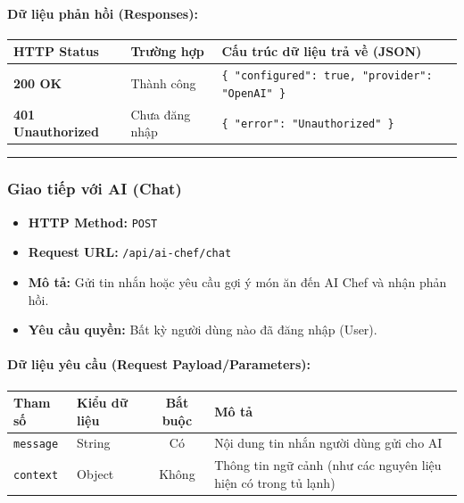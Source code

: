 \documentclass[12pt,a4paper]{article}
\begin{document}
\paragraph{Dữ liệu phản hồi (Responses):}
\begin{longtable}{|>{\raggedright\arraybackslash}p{2.8cm}|>{\raggedright\arraybackslash}p{3.2cm}|>{\raggedright\arraybackslash}p{8.0cm}|}
\hline
\textbf{HTTP Status} & \textbf{Trường hợp} & \textbf{Cấu trúc dữ liệu trả về (JSON)} \\ \hline
\endhead
\textbf{200 OK} & Thành công & \texttt{\{ "configured": true, "provider": "OpenAI" \}} \\ \hline
\textbf{401 Unauthorized} & Chưa đăng nhập & \texttt{\{ "error": "Unauthorized" \}} \\ \hline
\end{longtable}

\vskip 0.4cm
\noindent\rule{\textwidth}{0.3pt}
\vskip 0.4cm

\subsubsection{Giao tiếp với AI (Chat)}
\begin{itemize}[leftmargin=*]
    \item \textbf{HTTP Method:} \texttt{POST}
    \item \textbf{Request URL:} \texttt{/api/ai-chef/chat}
    \item \textbf{Mô tả:} Gửi tin nhắn hoặc yêu cầu gợi ý món ăn đến AI Chef và nhận phản hồi.
    \item \textbf{Yêu cầu quyền:} Bất kỳ người dùng nào đã đăng nhập (User).
\end{itemize}

\paragraph{Dữ liệu yêu cầu (Request Payload/Parameters):}
\begin{longtable}{|>{\raggedright\arraybackslash}p{2.8cm}|>{\raggedright\arraybackslash}p{2.2cm}|c|>{\raggedright\arraybackslash}p{7.0cm}|}
\hline
\textbf{Tham số} & \textbf{Kiểu dữ liệu} & \textbf{Bắt buộc} & \textbf{Mô tả} \\ \hline
\endhead
\texttt{message} & String & Có & Nội dung tin nhắn người dùng gửi cho AI \\ \hline
\texttt{context} & Object & Không & Thông tin ngữ cảnh (như các nguyên liệu hiện có trong tủ lạnh) \\ \hline
\end{longtable}
\end{document}
